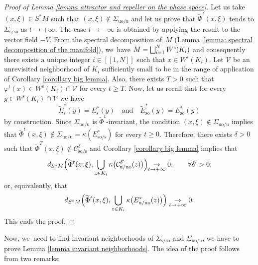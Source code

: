 \documentclass[JEP,XML,SOM,Unicode,NoEqCountersInSection,NoFloatCountersInSection,published]{cedram}
\let\oldbigsqcup\bigsqcup
\renewcommand{\bigsqcup}{\mathop{\textstyle\oldbigsqcup}\displaylimits}
\newcommand{\lcr}{[\![}
\newcommand{\rcr}{]\!]}
\newcommand{\rs}{\mathrm{s}}
\newcommand{\rso}{\mathrm{so}}
\newcommand{\ru}{\mathrm{u}}
\newcommand{\ruo}{\mathrm{uo}}
\theoremstyle{definition}
\theoremstyle{plain}
\newcommand{\Ccal}{\mathcal{C}}
\newcommand{\Vcal}{\mathcal{V}}
\begin{document}
\begin{proof}[Proof of Lemma \ref{lemma attractor and repeller on the phase space}] Let us take $(x,\xi) \in S^* M$ such that $(x,\xi) \notin \Sigma_{\ruo/\ru}$ and let us prove that $\widetilde{\Phi}^t (x, \xi)$ tends to $\Sigma_{\rs/\rso}$ as $t \to +\infty$. The case $t\to-\infty$ is obtained by applying the result to the vector field $-V$. From the spectral decomposition of~$M$ (Lemma \ref{lemma: spectral decomposition of the manifold}), we~have $M = \bigsqcup_{i = 1}^N W^\rs (K_i)$ and consequently there exists a unique integer $i\in\lcr1,N\rcr$ such that $x \in W^\rs (K_i)$. Let $\Vcal$ be an unrevisited neighborhood of $K_i$ sufficiently small to be in the range of application of Corollary \ref{corollary big lemma}. Also, there exists $T > 0$ such that $\varphi^t (x) \in W^\rs (K_i) \cap \Vcal$ for every $t \geq T$. Now, let us recall that for every $y \in W^\rs (K_i) \cap \Vcal$ we have
\[
\widetilde{E}_\rs^* (y) = E_\rs^* (y) \quad \text{and} \quad \widetilde{E}_{\rso}^* (y) = E_{\rso}^* (y)
\]
by construction. Since $\Sigma_{\ruo/\ru}$ is $\widetilde{\Phi}^t$-invariant, the condition $(x,\xi) \notin \Sigma_{\ruo/\ru} $ implies that $\widetilde{\Phi}^t (x,\xi) \notin \Sigma_{\ruo/\ru} = \kappa(E_{\rso/\rs}^*)$ for every $t \geq 0$. Therefore, there exists $\delta > 0$ such that $ \widetilde{\Phi}^T (x,\xi) \notin \Ccal_{\rso/\rs}^{\delta}$ and Corollary \ref{corollary big lemma} implies that
\[
d_{S^* M} \Bigl(\widetilde{\Phi}^t (x,\xi), \bigcup_{z \in K_i} \kappa \bigl(\Ccal_{\ru/\ruo}^{\delta'} (z) \bigr) \Bigl) \underset{t \to +\infty}{\to} 0, \qquad \forall \delta' > 0,
\]
or, equivalently, that
\[
d_{S^* M} \Bigl(\widetilde{\Phi}^t (x,\xi), \bigcup_{z \in K_i } \kappa \bigl(E_{\ru/\ruo}^* (z)\bigr) \Bigr) \underset{t \to +\infty}{\to} 0.
\]
This ends the proof.
\end{proof}

\label{subsection: Lemma invariant neighborhoods for the Hamiltonian flow}

Now, we~need to find invariant neighborhoods of $\Sigma_{\rs/\rso}$ and $\Sigma_{\ruo/\ru}$, \ie we have to prove Lemma \ref{lemma invariant neighborhoods}. The idea of the proof follows from two remarks:
\end{document}
